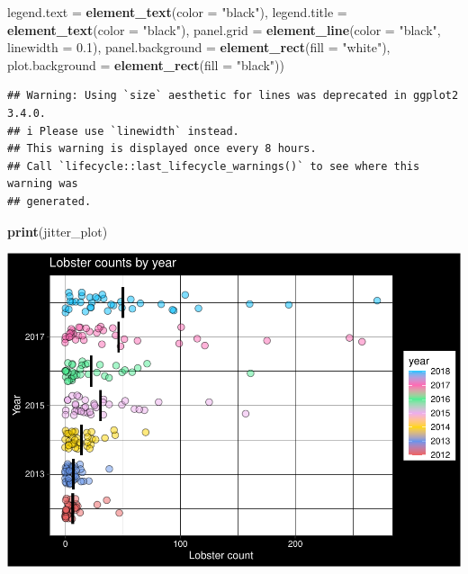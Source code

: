 \documentclass[
]{article}
\newenvironment{Shaded}{\begin{snugshade}}{\end{snugshade}}
\newcommand{\AttributeTok}[1]{\textcolor[rgb]{0.13,0.29,0.53}{#1}}
\newcommand{\FloatTok}[1]{\textcolor[rgb]{0.00,0.00,0.81}{#1}}
\newcommand{\FunctionTok}[1]{\textcolor[rgb]{0.13,0.29,0.53}{\textbf{#1}}}
\newcommand{\NormalTok}[1]{#1}
\newcommand{\StringTok}[1]{\textcolor[rgb]{0.31,0.60,0.02}{#1}}
\begin{document}
\begin{Shaded}
\begin{Highlighting}[]
        \AttributeTok{legend.text =} \FunctionTok{element\_text}\NormalTok{(}\AttributeTok{color =} \StringTok{"black"}\NormalTok{),}
        \AttributeTok{legend.title =} \FunctionTok{element\_text}\NormalTok{(}\AttributeTok{color =} \StringTok{"black"}\NormalTok{),}
        \AttributeTok{panel.grid =} \FunctionTok{element\_line}\NormalTok{(}\AttributeTok{color =} \StringTok{"black"}\NormalTok{,}
                                  \AttributeTok{linewidth =} \FloatTok{0.1}\NormalTok{),}
        \AttributeTok{panel.background =} \FunctionTok{element\_rect}\NormalTok{(}\AttributeTok{fill =} \StringTok{"white"}\NormalTok{),}
        \AttributeTok{plot.background =} \FunctionTok{element\_rect}\NormalTok{(}\AttributeTok{fill =} \StringTok{"black"}\NormalTok{)) }
\end{Highlighting}
\end{Shaded}

\begin{verbatim}
## Warning: Using `size` aesthetic for lines was deprecated in ggplot2 3.4.0.
## i Please use `linewidth` instead.
## This warning is displayed once every 8 hours.
## Call `lifecycle::last_lifecycle_warnings()` to see where this warning was
## generated.
\end{verbatim}

\begin{Shaded}
\begin{Highlighting}[]
\FunctionTok{print}\NormalTok{(jitter\_plot)}
\end{Highlighting}
\end{Shaded}

\includegraphics{hw1-lobstrs-eds241_files/figure-latex/unnamed-chunk-9-1.pdf}
\end{document}
